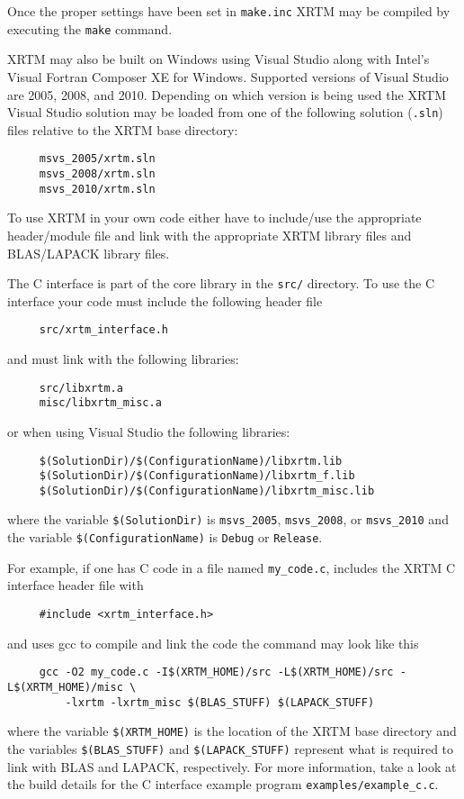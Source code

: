 Once the proper settings have been set in \texttt{make.inc} XRTM may be compiled by executing the \texttt{make} command.


\label{building_and_using_xrtm_building_xrtm_visual_studio}

XRTM may also be built on Windows using Visual Studio along with Intel's Visual Fortran Composer XE for Windows.  Supported versions of Visual Studio are 2005, 2008, and 2010.   Depending on which version is being used the XRTM Visual Studio solution may be loaded from one of the following solution (\texttt{.sln}) files relative to the XRTM base directory:
\begin{verbatim}
     msvs_2005/xrtm.sln
     msvs_2008/xrtm.sln
     msvs_2010/xrtm.sln
\end{verbatim}


\label{building_and_using_xrtm_using_xrtm_in_your_code}

To use XRTM in your own code either have to include/use the appropriate header/module file and link with the appropriate XRTM library files and BLAS/LAPACK library files.


\label{building_and_using_xrtm_using_xrtm_in_your_code_c}

The C interface is part of the core library in the \texttt{src/} directory.  To use the C interface your code must include the following header file
\begin{verbatim}
     src/xrtm_interface.h
\end{verbatim}
and must link with the following libraries:
\begin{verbatim}
     src/libxrtm.a
     misc/libxrtm_misc.a
\end{verbatim}
or when using Visual Studio the following libraries:
\begin{verbatim}
     $(SolutionDir)/$(ConfigurationName)/libxrtm.lib
     $(SolutionDir)/$(ConfigurationName)/libxrtm_f.lib
     $(SolutionDir)/$(ConfigurationName)/libxrtm_misc.lib
\end{verbatim}
where the variable \texttt{\$(SolutionDir)} is \texttt{msvs\_2005}, \texttt{msvs\_2008}, or \texttt{msvs\_2010} and the variable \texttt{\$(ConfigurationName)} is \texttt{Debug} or \texttt{Release}.

For example, if one has C code in a file named \texttt{my\_code.c}, includes the XRTM C interface header file with
\begin{verbatim}
     #include <xrtm_interface.h>
\end{verbatim}
and uses gcc to compile and link the code the command may look like this
\begin{verbatim}
     gcc -O2 my_code.c -I$(XRTM_HOME)/src -L$(XRTM_HOME)/src -L$(XRTM_HOME)/misc \
         -lxrtm -lxrtm_misc $(BLAS_STUFF) $(LAPACK_STUFF)
\end{verbatim}
where the variable \texttt{\$(XRTM\_HOME)} is the location of the XRTM base directory and the variables \texttt{\$(BLAS\_STUFF)} and \texttt{\$(LAPACK\_STUFF)} represent what is required to link with BLAS and LAPACK, respectively.  For more information, take a look at the build details for the C interface example program \texttt{examples/example\_c.c}.


